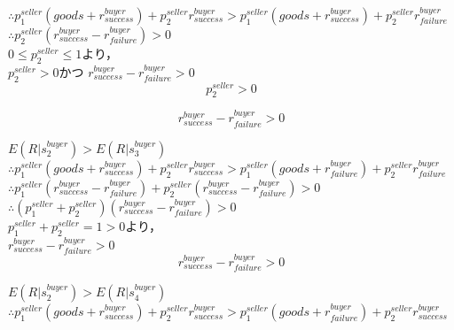 \documentclass[twocolumn, a4j]{article}
\begin{document}
$\therefore p^{seller}_1 (goods + r^{buyer}_{success}) + p^{seller}_2 r^{buyer}_{success} > p^{seller}_1 (goods + r^{buyer}_{success}) + p^{seller}_2 r^{buyer}_{failure}$\\

$\therefore p^{seller}_2 (r^{buyer}_{success} - r^{buyer}_{failure}) > 0$\\

$0 \leq p^{seller}_2 \leq 1$より，\\

$p^{seller}_2 > 0$かつ
$r^{buyer}_{success} - r^{buyer}_{failure} > 0$\\

\begin{equation}
  p^{seller}_2 > 0
\end{equation}

\begin{equation}
  \label{quad2-1}
  r^{buyer}_{success} - r^{buyer}_{failure} > 0
\end{equation}

$ E(R|s^{buyer}_2) > E(R|s^{buyer}_3)$\\

$\therefore p^{seller}_1 (goods + r^{buyer}_{success}) + p^{seller}_2 r^{buyer}_{success} > p^{seller}_1 (goods + r^{buyer}_{failure}) + p^{seller}_2 r^{buyer}_{failure}$\\

$\therefore p^{seller}_1 (r^{buyer}_{success} - r^{buyer}_{failure}) + p^{seller}_2 (r^{buyer}_{success} - r^{buyer}_{failure}) > 0$\\

$\therefore (p^{seller}_1 + p^{seller}_2)(r^{buyer}_{success} - r^{buyer}_{failure}) > 0$\\

$ p^{seller}_1 + p^{seller}_2 = 1 > 0$より，\\

$ r^{buyer}_{success} - r^{buyer}_{failure} > 0$\\

\begin{equation}
  \label{quad2-2}
  r^{buyer}_{success} - r^{buyer}_{failure} > 0
\end{equation}

$ E(R|s^{buyer}_2) > E(R|s^{buyer}_4)$\\

$\therefore p^{seller}_1 (goods + r^{buyer}_{success}) + p^{seller}_2 r^{buyer}_{success} > p^{seller}_1 (goods + r^{buyer}_{failure}) + p^{seller}_2 r^{buyer}_{success}$\\
\end{document}
